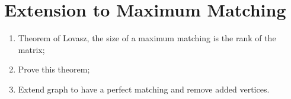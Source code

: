 \chapter{Extension to Maximum Matching}

\begin{enumerate}
    \item Theorem of Lovasz, the size of a maximum matching is the rank of the matrix;
    \item Prove this theorem;
    \item Extend graph to have a perfect matching and remove added vertices.
\end{enumerate}